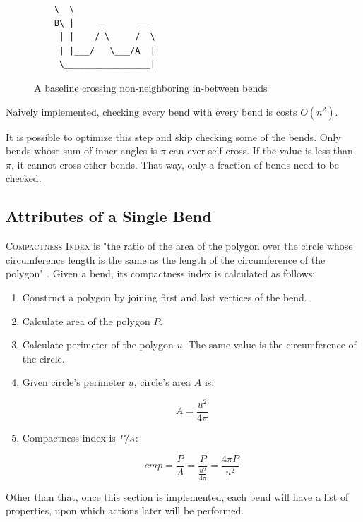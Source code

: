 \documentclass[a4paper]{article}
\begin{document}
\begin{figure}[h]
    \centering
    \begin{BVerbatim}
    \  \
    B\ |     _       __
     | |    / \     /  \
     | |___/   \___/A  |
     \_________________|
    \end{BVerbatim}
    \caption{A baseline crossing non-neighboring in-between bends}
    \label{fig:ascii-selfcross}
\end{figure}

Naively implemented, checking every bend with every bend is costs $O(n^2)$.

It is possible to optimize this step and skip checking some of the bends. Only
bends whose sum of inner angles is $\pi$ can ever self-cross. If the value is
less than $\pi$, it cannot cross other bends. That way, only a fraction of
bends need to be checked.

\subsection{Attributes of a Single Bend}

\textsc{Compactness Index} is "the ratio of the area of the polygon over the
circle whose circumference length is the same as the length of the
circumference of the polygon" \cite{wang1998line}. Given a bend, its
compactness index is calculated as follows:

\begin{enumerate}

  \item Construct a polygon by joining first and last vertices of the bend.

  \item Calculate area of the polygon $P$.

  \item Calculate perimeter of the polygon $u$. The same value is the
    circumference of the circle.

  \item Given circle's perimeter $u$, circle's area $A$ is:

    \[
      A = \frac{u^2}{4\pi}
    \]

  \item Compactness index is $\nicefrac{P}{A}$:

    \[
      cmp = \frac{P}{A} = \frac{P}{ \frac{u^2}{4\pi} } = \frac{4\pi P}{u^2}
    \]

\end{enumerate}

Other than that, once this section is implemented, each bend will have a list
of properties, upon which actions later will be performed.
\end{document}
